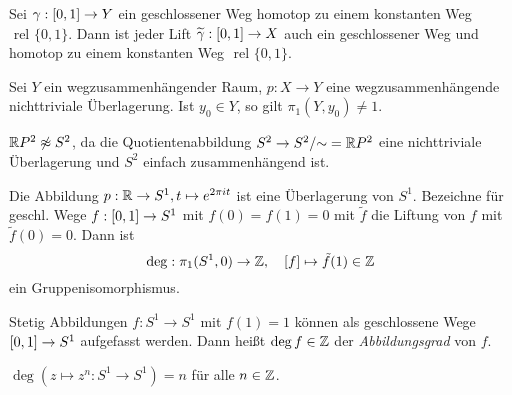 \documentclass{cheat-sheet}
\newcommand{\rel}{\text{ rel }} %
\begin{document}
\begin{kor}
  Sei $\gamma : \left[ 0, 1 \right] \to Y$ ein geschlossener Weg homotop zu einem konstanten Weg $\rel \{ 0, 1 \}$. Dann ist jeder Lift $\widetilde{\gamma} : \left[ 0, 1 \right] \to X$ auch ein geschlossener Weg und homotop zu einem konstanten Weg $\rel \{ 0, 1 \}$.
\end{kor}

\begin{kor}
  Sei $Y$ ein wegzusammenhängender Raum, $p : X \to Y$ eine wegzusammenhängende nichttriviale Überlagerung. Ist $y_0 \in Y$, so gilt $\pi_1(Y, y_0) \not= 1$.
\end{kor}

\begin{kor}
  $\mathbb{R} P^2 \not\approx S^2$, da die Quotientenabbildung $S^2 \to S^2/{\sim} = \mathbb{R} P^2$ eine nichttriviale Überlagerung und $S^2$ einfach zusammenhängend ist.
\end{kor}

\begin{prop}
  Die Abbildung $p : \mathbb{R} \to S^1, t \mapsto e^{2 \pi i t}$ ist eine Überlagerung von $S^1$. Bezeichne für geschl. Wege $f : \left[ 0, 1 \right] \to S^1$ mit $f(0) = f(1) = 0$ mit $\tilde{f}$ die Liftung von $f$ mit $\tilde{f}(0) = 0$. Dann ist
  \[ \mathrm{deg} : \pi_1(S^1, 0) \to \mathbb{Z}, \quad [f] \mapsto \tilde{f}(1) \in \mathbb{Z} \]
  ein Gruppenisomorphismus.
\end{prop}

\begin{defn}
  Stetig Abbildungen $f : S^1 \to S^1$ mit $f(1) = 1$ können als geschlossene Wege $\left[ 0, 1 \right] \to S^1$ aufgefasst werden. Dann heißt $\deg f \in \mathbb{Z}$ der \emph{Abbildungsgrad} von $f$.
\end{defn}

\begin{prop}
  $\deg(z \mapsto z^n : S^1 \to S^1) = n$ für alle $n \in \mathbb{Z}$.
\end{prop}
\end{document}

